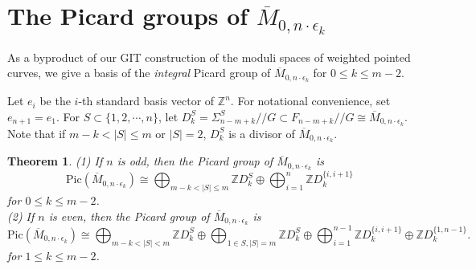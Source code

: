 \documentclass[10pt]{amsart}
\newtheorem{theorem}{Theorem}[section]
\theoremstyle{definition}
\newcommand{\ZZ}{\mathbb{Z}}
\def\Mzek{\overline{M}_{0,n\cdot \epsilon_k} }
\def\git{/\!/ }
\begin{document}
\section{The Picard groups of $\Mzek$}\label{sec5}

As a byproduct of our GIT construction of the moduli spaces of
weighted pointed curves, we give a basis of the \emph{integral}
Picard group of $\Mzek$ for $0 \le k \le m-2$.

Let $e_i$ be the $i$-th standard basis vector of $\ZZ^n$. For
notational convenience, set $e_{n+1} = e_1$. For $S\subset
\{1,2,\cdots,n\}$, let $D_k^S=\Sigma_{n-m+k}^S\git G\subset
F_{n-m+k}\git G\cong \Mzek$. Note that if $m-k<|S|\le m$ or
$|S|=2$, $D_k^S$ is a divisor of $\Mzek$.

\begin{theorem}\label{picardgroup}
(1) If $n$ is odd, then the Picard group of $\Mzek$ is
\[
    \mathrm{Pic} (\Mzek) \cong \bigoplus_{m-k < |S| \le m} \ZZ D^S_k \oplus
    \bigoplus_{i=1}^n \ZZ D_k^{\{i, i+1\}}
\]
for $0 \le k \le m-2$.\\
(2) If $n$ is even, then the Picard group of $\Mzek$ is
\[
    \mathrm{Pic} (\Mzek) \cong \bigoplus_{m-k < |S| < m} \ZZ D^S_k \oplus
    \bigoplus_{1 \in S, |S| = m} \ZZ D^S_k \oplus
    \bigoplus_{i=1}^{n-1} \ZZ D_k^{\{i, i+1\}}
    \oplus \ZZ D_k^{\{1, n-1\}}.
\]
for $1 \le k \le m-2$.
\end{theorem}
\end{document}
